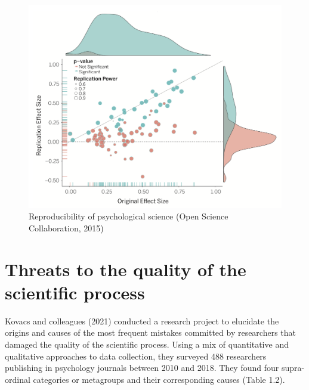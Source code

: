 \documentclass[
]{book}
\theoremstyle{definition}
\theoremstyle{definition}
\theoremstyle{definition}
\theoremstyle{definition}
\theoremstyle{remark}
\begin{document}
\begin{figure}

{\centering \includegraphics[width=0.9\linewidth]{./images/replic} 

}

\caption{Reproducibility of psychological science (Open Science Collaboration, 2015)}\label{fig:replication1}
\end{figure}

\hypertarget{threats-to-the-quality-of-the-scientific-process}{%
\section{Threats to the quality of the scientific process}\label{threats-to-the-quality-of-the-scientific-process}}

Kovacs and colleagues (2021) conducted a research project to elucidate the origins and causes of the most frequent mistakes committed by researchers that damaged the quality of the scientific process. Using a mix of quantitative and qualitative approaches to data collection, they surveyed 488 researchers publishing in psychology journals between 2010 and 2018. They found four supra-ordinal categories or metagroups and their corresponding causes (Table 1.2).
\end{document}
